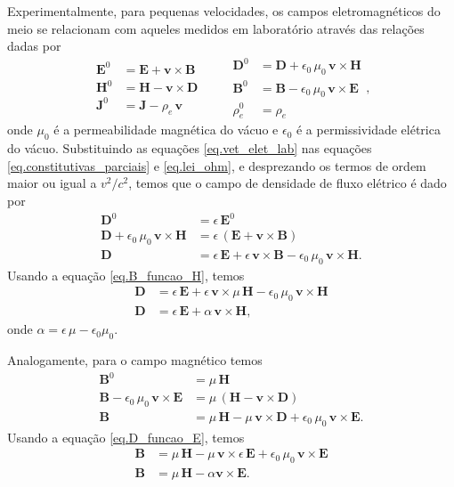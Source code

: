 Experimentalmente, para pequenas velocidades, os campos eletromagn\'eticos do meio se relacionam com aqueles medidos em laborat\'orio atrav\'es das rela\c{c}\~oes dadas por \cite{eringen_1963}
\begin{equation}\label{eq.vet_elet_lab}
\begin{aligned}
\mathbf{E}^0&=\mathbf{E}+\mathbf{v}\times\mathbf{B}\\
\mathbf{H}^0&=\mathbf{H}-\mathbf{v}\times\mathbf{D}\\
\mathbf{J}^0&=\mathbf{J}-\rho_e\,\mathbf{v}
\end{aligned}
\qquad
\begin{aligned}
\mathbf{D}^0&=\mathbf{D}+\epsilon_0\,\mu_0\,\mathbf{v}\times\mathbf{H}\\
\mathbf{B}^0&=\mathbf{B}-\epsilon_0\,\mu_0\,\mathbf{v}\times\mathbf{E}\\
\rho_e^0&=\rho_e
\end{aligned},
\end{equation}
onde $\mu_0$ \'e a permeabilidade magn\'etica do v\'acuo e $\epsilon_0$ \'e a permissividade el\'etrica do v\'acuo. Substituindo as equa\c{c}\~oes \ref{eq.vet_elet_lab} nas equa\c{c}\~oes \ref{eq.constitutivas_parciais} e \ref{eq.lei_ohm}, e desprezando os termos de ordem maior ou igual a $v^2/c^2$, temos que o campo de densidade de fluxo el\'etrico \'e dado por
\begin{align*}
\mathbf{D}^0&=\epsilon\,\mathbf{E}^0\\
\mathbf{D}+\epsilon_0\,\mu_0\,\mathbf{v}\times\mathbf{H}&=\epsilon\,(\mathbf{E}+\mathbf{v}\times\mathbf{B})\\
\mathbf{D}&=\epsilon\,\mathbf{E}+\epsilon\,\mathbf{v}\times\mathbf{B}-\epsilon_0\,\mu_0\,\mathbf{v}\times\mathbf{H}.
\end{align*}
Usando a equa\c{c}\~ao \ref{eq.B_funcao_H}, temos
\begin{align}\label{eq.constitutiva_1}\nonumber
\mathbf{D}&=\epsilon\,\mathbf{E}+\epsilon\,\mathbf{v}\times\mu\,\mathbf{H}-\epsilon_0\,\mu_0\,\mathbf{v}\times\mathbf{H}\\
\mathbf{D}&=\epsilon\,\mathbf{E}+\alpha\,\mathbf{v}\times\mathbf{H},
\end{align}
onde $\alpha=\epsilon\,\mu-\epsilon_0\mu_0$.

Analogamente, para o campo magn\'etico temos
\begin{align*}
\mathbf{B}^0&=\mu\,\mathbf{H}\\
\mathbf{B}-\epsilon_0\,\mu_0\,\mathbf{v}\times\mathbf{E}&=\mu\,(\mathbf{H}-\mathbf{v}\times\mathbf{D})\\
\mathbf{B}&=\mu\,\mathbf{H}-\mu\,\mathbf{v}\times\mathbf{D}+\epsilon_0\,\mu_0\,\mathbf{v}\times\mathbf{E}.
\end{align*}
Usando a equa\c{c}\~ao \ref{eq.D_funcao_E}, temos
\begin{align}\label{eq.constitutiva_2}\nonumber
\mathbf{B}&=\mu\,\mathbf{H}-\mu\,\mathbf{v}\times\epsilon\,\mathbf{E}+\epsilon_0\,\mu_0\,\mathbf{v}\times\mathbf{E}\\
\mathbf{B}&=\mu\,\mathbf{H}-\alpha\mathbf{v}\times\mathbf{E}.
\end{align}

